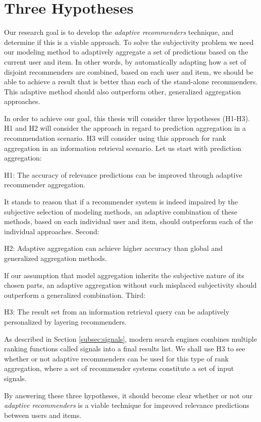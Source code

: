 \section{Three Hypotheses}
\label{sec:hypotheses}

Our research goal is to develop the \emph{adaptive recommenders} technique, and determine if this is a viable approach.
To solve the subjectivity problem we need our modeling method
to adaptively aggregate a set of predictions based on the current user and item.
In other words, by automatically adapting how a set of disjoint recommenders
are combined, based on each user and item, we should be able to achieve a
result that is better than each of the stand-alone recommenders.
This adaptive method should also outperform other, generalized aggregation approaches.

In order to achieve our goal, this thesis will consider three hypotheses (H1-H3).
H1 and H2 will consider the approach in regard to prediction aggregation
in a recommendation scenario. H3 will consider using this approach for
rank aggregation in an information retrieval scenario.
Let us start with prediction aggregation:

\begin{blockquote}
  H1: The accuracy of relevance predictions can be improved
  through adaptive recommender aggregation.
\end{blockquote}
%
It stands to reason that if a recommender system is indeed impaired
by the subjective selection of modeling methods,
an adaptive combination of these methods, based on each individual user and item, 
should outperform each of the individual approaches.
Second:

\begin{blockquote}
  H2: Adaptive aggregation can achieve higher accuracy than global and generalized aggregation methods.
\end{blockquote}
%
If our assumption that model aggregation inherits the subjective nature of its chosen parts,
an adaptive aggregation without such misplaced subjectivity should outperform a
generalized combination.
Third:

\begin{blockquote}
  H3: The result set from an information retrieval query
  can be adaptively personalized by layering recommenders.
\end{blockquote}
%
As described in Section \ref{subsec:signals},
modern search engines combines multiple ranking functions called signals into a final results list.
We shall use H3 to see whether or not adaptive recommenders can be used for this type of rank aggregation,
where a set of recommender systems constitute a set of input signals.

By answering these three hypotheses, it should become clear whether or not
our \emph{adaptive recommenders} is a viable technique for improved relevance predictions
between users and items.

